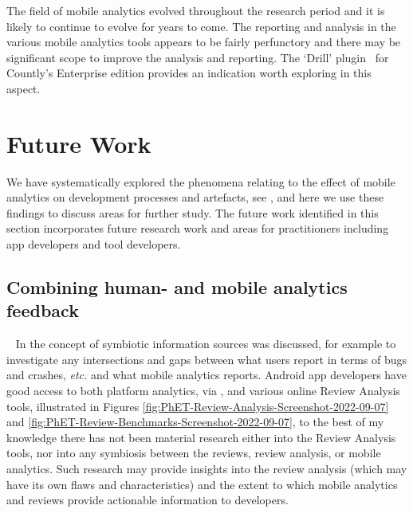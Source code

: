 The field of mobile analytics evolved throughout the research period and it is likely to continue to evolve for years to come. The reporting and analysis in the various mobile analytics tools appears to be fairly perfunctory and there may be significant scope to improve the analysis and reporting. The `Drill' plugin~ for Countly's Enterprise edition provides an indication worth exploring in this aspect.




\clearpage
\section{Future Work}
We have systematically explored the phenomena relating to the effect of mobile analytics on development processes and artefacts, see , and here we use these findings to discuss areas for further study. The future work identified in this section incorporates future research work and areas for practitioners including app developers and tool developers.


\subsection{Combining human- and mobile analytics feedback}~\label{fw-combining-reviews-and-mobile-analytics-topic}
In  the concept of symbiotic information sources was discussed, for example to investigate any intersections and gaps between what users report in terms of bugs and crashes, \emph{etc.} and what mobile analytics reports. Android app developers have good access to both platform analytics, via , and various online Review Analysis tools, illustrated in Figures \ref{fig:PhET-Review-Analysis-Screenshot-2022-09-07} and \ref{fig:PhET-Review-Benchmarks-Screenshot-2022-09-07}, to the best of my knowledge there has not been material research either into the Review Analysis tools, nor into any symbiosis between the reviews, review analysis, or mobile analytics. Such research may provide insights into the review analysis (which may have its own flaws and characteristics) and the extent to which mobile analytics and reviews provide actionable information to developers.

